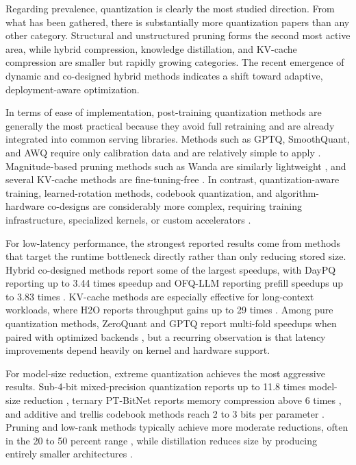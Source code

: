 Regarding prevalence, quantization is clearly the most studied direction. From what has been gathered, there is substantially more quantization papers than any other category. Structural and unstructured pruning forms the second most active area, while hybrid compression, knowledge distillation, and KV-cache compression are smaller but rapidly growing categories. The recent emergence of dynamic and co-designed hybrid methods indicates a shift toward adaptive, deployment-aware optimization.

In terms of ease of implementation, post-training quantization methods are generally the most practical because they avoid full retraining and are already integrated into common serving libraries. Methods such as GPTQ, SmoothQuant, and AWQ require only calibration data and are relatively simple to apply \cite{frantar2023gptq,xiao2023smoothquant,lin2024awq}. Magnitude-based pruning methods such as Wanda are similarly lightweight \cite{sun2024wanda}, and several KV-cache methods are fine-tuning-free \cite{zhang2023h2o,li2024snapkv}. In contrast, quantization-aware training, learned-rotation methods, codebook quantization, and algorithm-hardware co-designs are considerably more complex, requiring training infrastructure, specialized kernels, or custom accelerators \cite{xu2026daypq,liu2025spinquant,tseng2024qtip,chen2025efficientqat}.

For low-latency performance, the strongest reported results come from methods that target the runtime bottleneck directly rather than only reducing stored size. Hybrid co-designed methods report some of the largest speedups, with DayPQ reporting up to 3.44 times speedup and OFQ-LLM reporting prefill speedups up to 3.83 times \cite{xu2026daypq,wang2025ofqllm}. KV-cache methods are especially effective for long-context workloads, where H2O reports throughput gains up to 29 times \cite{zhang2023h2o}. Among pure quantization methods, ZeroQuant and GPTQ report multi-fold speedups when paired with optimized backends \cite{yao2022zeroquant,frantar2023gptq}, but a recurring observation is that latency improvements depend heavily on kernel and hardware support.

For model-size reduction, extreme quantization achieves the most aggressive results. Sub-4-bit mixed-precision quantization reports up to 11.8 times model-size reduction \cite{cho2025sub4bit}, ternary PT-BitNet reports memory compression above 6 times \cite{survey2025ptbitnet}, and additive and trellis codebook methods reach 2 to 3 bits per parameter \cite{egiazarian2024aqlm,tseng2024qtip}. Pruning and low-rank methods typically achieve more moderate reductions, often in the 20 to 50 percent range \cite{ashkboos2024slicegpt,zhang2024loraprune,wang2025svdllm}, while distillation reduces size by producing entirely smaller architectures \cite{jiao2020tinybert,muralidharan2024minitron}.

